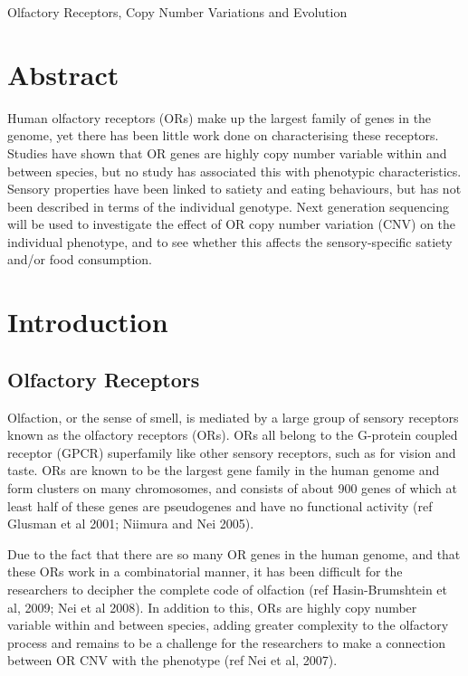 \documentclass[a4paper, 12pt]{article}
\begin{document}
\begin{center}
\large{Olfactory Receptors, Copy Number Variations and Evolution}
\end{center}

\section*{Abstract}

Human olfactory receptors (ORs) make up the largest family of genes in the genome, yet there has been little work done on characterising these receptors.
Studies have shown that OR genes are highly copy number variable within and between species, but no study has associated this with phenotypic characteristics.
Sensory properties have been linked to satiety and eating behaviours, but has not been described in terms of the individual genotype.
Next generation sequencing will be used to investigate the effect of OR copy number variation (CNV) on the individual phenotype, and to see whether this affects the sensory-specific satiety and/or food consumption.

\section*{Introduction}

\subsection*{Olfactory Receptors}

Olfaction, or the sense of smell, is mediated by a large group of sensory receptors known as the olfactory receptors (ORs).
ORs all belong to the G-protein coupled receptor (GPCR) superfamily like other sensory receptors, such as for vision and taste.
ORs are known to be the largest gene family in the human genome and form clusters on many chromosomes, and consists of about 900 genes of which at least half of these genes are pseudogenes and have no functional activity (ref Glusman et al 2001; Niimura and Nei 2005).

Due to the fact that there are so many OR genes in the human genome, and that these ORs work in a combinatorial manner, it has been difficult for the researchers to decipher the complete code of olfaction (ref Hasin-Brumshtein et al, 2009; Nei et al 2008).
In addition to this, ORs are highly copy number variable within and between species, adding greater complexity to the olfactory process and remains to be a challenge for the researchers to make a connection between OR CNV with the phenotype (ref Nei et al, 2007).
\end{document}
